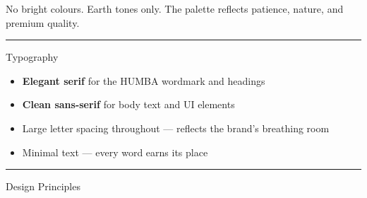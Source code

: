 \documentclass[a4paper,11pt]{article}
\begin{document}
\vspace{4pt}
{\color{textmuted}\fontsize{9pt}{13pt}\selectfont\centering No bright colours. Earth tones only. The palette reflects patience, nature, and premium quality.\par}

\vspace{14pt}
{\fontsize{11pt}{11pt}\selectfont\latosemibold\color{hblack}\hspace{2pt}\textcolor{holive}{\rule{2.5pt}{11pt}}\hspace{8pt}Typography}

\vspace{6pt}
\begin{itemize}[leftmargin=8mm, itemsep=3pt, label={\textcolor{holive}{$\circ$}}]
  \item {\color{textbody}\fontsize{10pt}{14pt}\selectfont \textbf{Elegant serif} for the HUMBA\texttrademark{} wordmark and headings}
  \item {\color{textbody}\fontsize{10pt}{14pt}\selectfont \textbf{Clean sans-serif} for body text and UI elements}
  \item {\color{textbody}\fontsize{10pt}{14pt}\selectfont Large letter spacing throughout --- reflects the brand's breathing room}
  \item {\color{textbody}\fontsize{10pt}{14pt}\selectfont Minimal text --- every word earns its place}
\end{itemize}

\vspace{14pt}
{\fontsize{11pt}{11pt}\selectfont\latosemibold\color{hblack}\hspace{2pt}\textcolor{holive}{\rule{2.5pt}{11pt}}\hspace{8pt}Design Principles}
\end{document}

